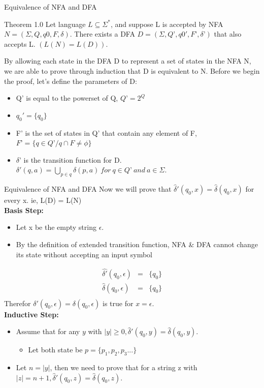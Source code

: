 \documentclass{beamer}
\begin{document}
\begin{frame}{Equivalence of NFA and DFA}
	\begin{block}{Theorem 1.0}
		Let language $L \subseteq \Sigma^*$, and suppose L is accepted by NFA $N = (\Sigma, Q, q0, F, \delta)$. There exists a DFA $D= (\Sigma, Q’, q0', F’, \delta’)$ that also accepts L. $(L(N) = L(D))$.
	\end{block}
By allowing each state in the DFA D to represent a set of states in the NFA N, we are able to prove through induction that D is equivalent to N. Before we begin the proof, let’s define the parameters of D:
\begin{itemize}
	\item Q’ is equal to the powerset of Q, $Q’ = 2^Q$
	\item $q_0' = \{q_0\}$
	\item F’ is the set of states in Q’ that contain any element of F, $F’ = \{q \in Q’/q \cap F \neq \phi\}$
	\item $\delta$’ is the transition function for D.  $\delta{'}(q, a) = \bigcup_{p \in q} \delta(p, a)\  for\  q \in Q’\  and \ a\in \Sigma.$
\end{itemize}
\end{frame}
\begin{frame}{Equivalence of NFA and DFA}
Now we will prove that $\hat\delta'(q_0,x) = \hat\delta(q_0, x)$ for every x. ie, L(D) = L(N)\\
\textbf{Basis Step:}
	\begin{itemize}
		\item Let x be the empty string $\epsilon$.
		\item By the definition of extended transition function, NFA \& DFA cannot change its state without accepting an input symbol
	\end{itemize}
\begin{eqnarray*}
\hat{\delta'}(q_0,\epsilon) &=& \{q_0\}\\
	\hat{\delta}(q_0,\epsilon) &=& \{q_0\}\\
\end{eqnarray*}
Therefor $\delta'(q_0,\epsilon)=\delta(q_0,\epsilon)$ is true for $x=\epsilon$. \\
\textbf{Inductive Step:}
\begin{itemize}
	\item Assume that for any $y$ with $|y| \geq 0, \hat\delta'(q_0,y) = \hat\delta(q_0, y)$.
	\begin{itemize}
		\item Let both state be $p=\{p_1,p_2,p_3...\}$
	\end{itemize}
	\item Let $n = |y|$, then we need to prove that for a string z with $|z| = n + 1, \hat\delta'(q_0,z) = \hat\delta(q_0, z)$. 
\end{itemize}
\end{frame}
\end{document}

